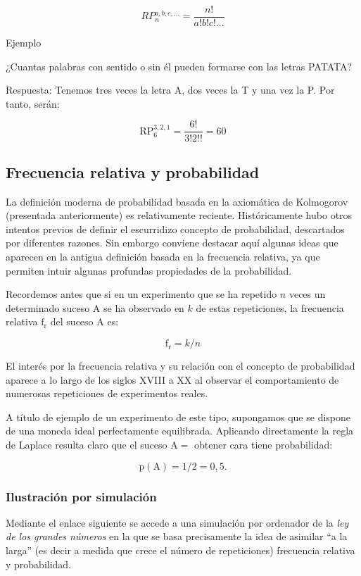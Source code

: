 \documentclass[
]{article}
\begin{document}
\[
R P{ }_{n}^{a, b, c, \ldots}=\frac{n!}{a!b!c!\ldots}
\]

Ejemplo

¿Cuantas palabras con sentido o sin él pueden formarse con las letras
PATATA?

Respuesta: Tenemos tres veces la letra A, dos veces la T y una vez la P.
Por tanto, serán:

\[
\mathrm{RP}_{6}^{3,2,1}=\frac{6!}{3!2!!}=60
\]

\subsection{Frecuencia relativa y probabilidad}\label{frecuencia-relativa-y-probabilidad}

La definición moderna de probabilidad basada en la axiomática de
Kolmogorov (presentada anteriormente) es relativamente reciente.
Históricamente hubo otros intentos previos de definir el escurridizo
concepto de probabilidad, descartados por diferentes razones. Sin
embargo conviene destacar aquí algunas ideas que aparecen en la antigua
definición basada en la frecuencia relativa, ya que permiten intuir
algunas profundas propiedades de la probabilidad.

Recordemos antes que si en un experimento que se ha repetido \(n\) veces
un determinado suceso A se ha observado en \(k\) de estas repeticiones, la
frecuencia relativa \(\mathrm{f}_{\mathrm{r}}\) del suceso A es:

\[
\mathrm{f}_{\mathrm{r}}=k / n
\]

El interés por la frecuencia relativa y su relación con el concepto de
probabilidad aparece a lo largo de los siglos XVIII a XX al observar el
comportamiento de numerosas repeticiones de experimentos reales.

A título de ejemplo de un experimento de este tipo, supongamos que se
dispone de una moneda ideal perfectamente equilibrada. Aplicando
directamente la regla de Laplace resulta claro que el suceso
\(\mathrm{A}=\) obtener cara tiene probabilidad:

\[
\mathrm{p}(\mathrm{A})=1 / 2=0,5.
\]

\subsubsection{Ilustración por simulación}\label{ilustraciuxf3n-por-simulaciuxf3n}

Mediante el enlace siguiente se accede a una simulación por ordenador de la \emph{ley de los grandes números} en la que se basa precisamente la idea de asimilar ``a la larga'' (es decir a medida que crece el número de repeticiones) frecuencia relativa y probabilidad.
\end{document}

